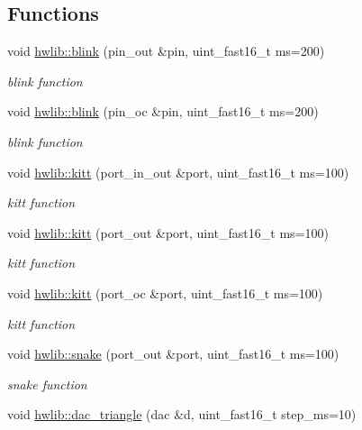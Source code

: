 \subsection*{Functions}
\begin{DoxyCompactItemize}
\item 
void \hyperlink{namespacehwlib_a07ec2b554dc2b3f7e20acfa07158bbdc}{hwlib\+::blink} (pin\+\_\+out \&pin, uint\+\_\+fast16\+\_\+t ms=200)
\begin{DoxyCompactList}\small\item\em blink function \end{DoxyCompactList}\item 
void \hyperlink{namespacehwlib_a4da0954a246d92ba3e62f22fa52bf3a3}{hwlib\+::blink} (pin\+\_\+oc \&pin, uint\+\_\+fast16\+\_\+t ms=200)
\begin{DoxyCompactList}\small\item\em blink function \end{DoxyCompactList}\item 
void \hyperlink{namespacehwlib_aaabcbce6ceaee099d8b63d7ced145cea}{hwlib\+::kitt} (port\+\_\+in\+\_\+out \&port, uint\+\_\+fast16\+\_\+t ms=100)
\begin{DoxyCompactList}\small\item\em kitt function \end{DoxyCompactList}\item 
void \hyperlink{namespacehwlib_a0e6f0ad32ff93519562a880047f3fc2e}{hwlib\+::kitt} (port\+\_\+out \&port, uint\+\_\+fast16\+\_\+t ms=100)
\begin{DoxyCompactList}\small\item\em kitt function \end{DoxyCompactList}\item 
void \hyperlink{namespacehwlib_a2f86682625c78a7c595bac456ed81b5c}{hwlib\+::kitt} (port\+\_\+oc \&port, uint\+\_\+fast16\+\_\+t ms=100)
\begin{DoxyCompactList}\small\item\em kitt function \end{DoxyCompactList}\item 
void \hyperlink{namespacehwlib_ade8d1e7034d2491a2180116619ec4fbe}{hwlib\+::snake} (port\+\_\+out \&port, uint\+\_\+fast16\+\_\+t ms=100)
\begin{DoxyCompactList}\small\item\em snake function \end{DoxyCompactList}\item 
void \hyperlink{namespacehwlib_a25454b1b1a7ef5887e55704c3b2fe5b0}{hwlib\+::dac\+\_\+triangle} (dac \&d, uint\+\_\+fast16\+\_\+t step\+\_\+ms=10)

\end{DoxyCompactItemize}
